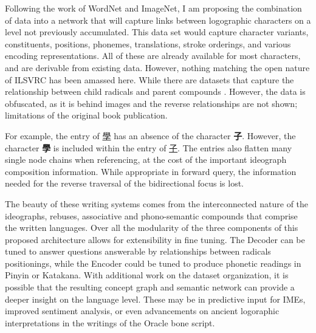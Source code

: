 Following the work of WordNet\cite{wordnet} and ImageNet\cite{imagenet}, I am proposing the combination of data into a network that will capture links between logographic characters on a level not previously accumulated. This data set would capture character variants, constituents, positions, phonemes, translations, stroke orderings, and various encoding representations. All of these are already available for most characters, and are derivable from existing data. However, nothing matching the open nature of ILSVRC\cite{imagenet} has been amassed here. While there are datasets that capture the relationship between child radicals and parent compounds \cite{zhongwen}. However, the data is obfuscated, as it is behind images and the reverse relationships are not shown; limitations of the original book publication.

For example, the entry of \href{http://zhongwen.com/d/190/x199.htm}{學} has an absence of the character \textbf{子}.
However, the character \textbf{學} is included within the entry of \href{http://zhongwen.com/d/164/x108.htm}{子}. 
The entries also flatten many single node chains when referencing, at the cost of the important ideograph composition information.
While appropriate in forward query, the information needed for the reverse traversal of the bidirectional focus is lost.

\newpage
 The beauty of these writing systems comes from the interconnected nature of the ideographs, rebuses, associative and phono-semantic compounds that comprise the written languages.
 Over all the modularity of the three components of this proposed architecture allows for extensibility in fine tuning.
 The Decoder can be tuned to answer questions answerable by relationships between radicals positionings, while the Encoder could be tuned to produce phonetic readings in Pinyin or Katakana. 
 With additional work on the dataset organization, it is possible that the resulting concept graph and semantic network can provide a deeper insight on the language level.
 These may be in predictive input for IMEs, improved sentiment analysis, or even advancements on ancient logoraphic interpretations in the writings of the Oracle bone script.
